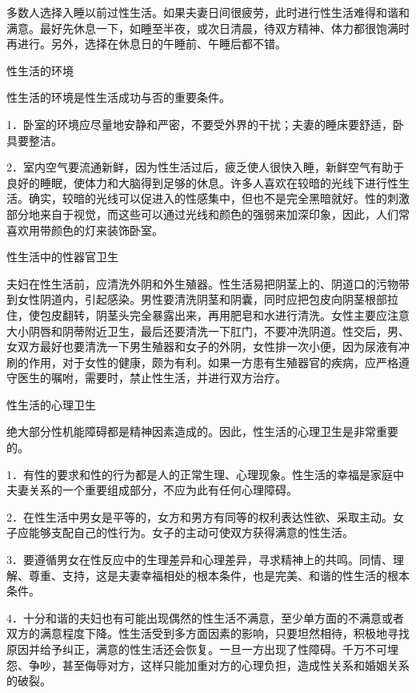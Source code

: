\documentclass[12pt,UTF8,openany]{ctexbook}
\begin{document}
多数人选择入睡以前过性生活。如果夫妻日间很疲劳，此时进行性生活难得和谐和满意。最好先休息一下，如睡至半夜，或次日清晨，待双方精神、体力都很饱满时再进行。另外，选择在休息日的午睡前、午睡后都不错。





性生活的环境


性生活的环境是性生活成功与否的重要条件。

1．卧室的环境应尽量地安静和严密，不要受外界的干扰；夫妻的睡床要舒适，卧具要整洁。

2．室内空气要流通新鲜，因为性生活过后，疲乏使人很快入睡，新鲜空气有助于良好的睡眠，使体力和大脑得到足够的休息。许多人喜欢在较暗的光线下进行性生活。确实，较暗的光线可以促进入的性感集中，但也不是完全黑暗就好。性的刺激部分地来自于视觉，而这些可以通过光线和颜色的强弱来加深印象，因此，人们常喜欢用带颜色的灯来装饰卧室。





性生活中的性器官卫生


夫妇在性生活前，应清洗外阴和外生殖器。性生活易把阴茎上的、阴道口的污物带到女性阴道内，引起感染。男性要清洗阴茎和阴囊，同时应把包皮向阴茎根部拉住，使包皮翻转，阴茎头完全暴露出来，再用肥皂和水进行清洗。女性主要应注意大小阴唇和阴蒂附近卫生，最后还要清洗一下肛门，不要冲洗阴道。性交后，男、女双方最好也要清洗一下男生殖器和女子的外阴，女性排一次小便，因为尿液有冲刷的作用，对于女性的健康，颇为有利。如果一方患有生殖器官的疾病，应严格遵守医生的嘱咐，需要时，禁止性生活，并进行双方治疗。





性生活的心理卫生


绝大部分性机能障碍都是精神因素造成的。因此，性生活的心理卫生是非常重要的。

1．有性的要求和性的行为都是人的正常生理、心理现象。性生活的幸福是家庭中夫妻关系的一个重要组成部分，不应为此有任何心理障碍。

2．在性生活中男女是平等的，女方和男方有同等的权利表达性欲、采取主动。女子应能够支配自己的性行为。女子的主动可使双方获得满意的性生活。

3．要遵循男女在性反应中的生理差异和心理差异，寻求精神上的共鸣。同情、理解、尊重、支持，这是夫妻幸福相处的根本条件，也是完美、和谐的性生活的根本条件。

4．十分和谐的夫妇也有可能出现偶然的性生活不满意，至少单方面的不满意或者双方的满意程度下降。性生活受到多方面因素的影响，只要坦然相待，积极地寻找原因并给予纠正，满意的性生活还会恢复。一旦一方出现了性障碍。千万不可埋怨、争吵，甚至侮辱对方，这样只能加重对方的心理负担，造成性关系和婚姻关系的破裂。
\end{document}
